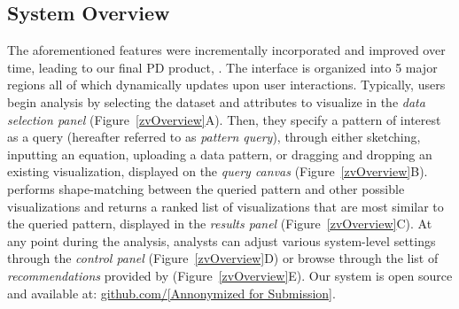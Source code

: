 

\subsection{System Overview\label{sec:system}}%
The aforementioned features were incrementally incorporated and improved over time, leading to our final PD product, \zvpp. The \zvpp interface is organized into 5 major regions all of which dynamically updates upon user interactions. Typically, users begin analysis by selecting the dataset and attributes to visualize in the \emph{data selection panel} (Figure~\ref{zvOverview}A). Then, they specify a pattern of interest as a query (hereafter referred to as \emph{pattern query}), through either sketching, inputting an equation, uploading a data pattern, or dragging and dropping an existing visualization, displayed on the \emph{query canvas} (Figure~\ref{zvOverview}B). \zvpp performs shape-matching between the queried pattern and other possible visualizations and returns a ranked list of visualizations that are most similar to the queried pattern, displayed in the \emph{results panel} (Figure~\ref{zvOverview}C). At any point during the analysis, analysts can adjust various system-level settings through the \emph{control panel} (Figure~\ref{zvOverview}D) or browse through the list of \emph{recommendations} provided by \zvpp (Figure~\ref{zvOverview}E).  Our \zvpp system is open source and available at: \url{github.com/[Annonymized for Submission]}.
